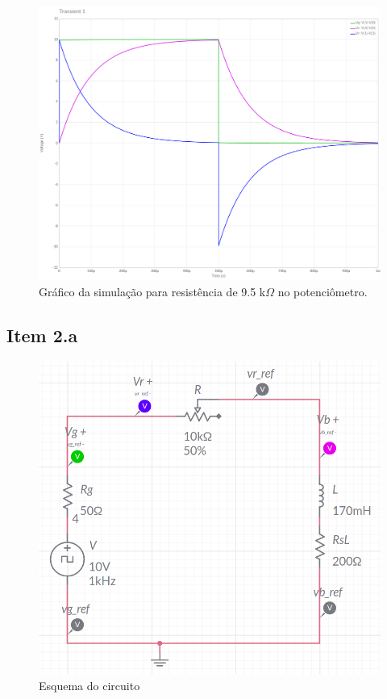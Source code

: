 \documentclass[11pt]{article}
\begin{document}
\begin{figure}[h!]
  \centering
  \includegraphics[width=.8\textwidth]{fig/1-p-95}
  \caption{Gráfico da simulação para resistência de 9.5 k$\Omega$ no potenciômetro.}
\end{figure}

\pagebreak

\subsection*{Item 2.a}

\begin{figure}[h!]
  \centering
  \includegraphics[width=.7\textwidth]{fig/2-circ}
  \caption{Esquema do circuito}
  \label{fig:2-circ}
\end{figure}
\end{document}
